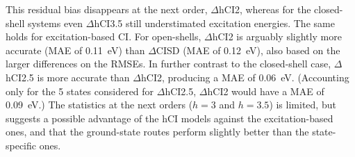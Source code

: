 \documentclass[aip,jcp,reprint,noshowkeys,superscriptaddress]{revtex4-1}
\begin{document}
This residual bias disappears at the next order, $\Delta$hCI2, whereas for the closed-shell systems even $\Delta$hCI3.5 still understimated excitation energies. 
The same holds for excitation-based CI.
For open-shells, $\Delta$hCI2 is arguably slightly more accurate (MAE of \SI{0.11}{\eV}) than $\Delta$CISD (MAE of \SI{0.12}{\eV}), also based on the larger differences on the RMSEs.
In further contrast to the closed-shell case,
$\Delta$hCI2.5 is more accurate than $\Delta$hCI2, producing a MAE of \SI{0.06}{\eV}.
(Accounting only for the 5 states considered for $\Delta$hCI2.5, $\Delta$hCI2 would have a MAE of \SI{0.09}{\eV}.)
The statistics at the next orders ($h=3$ and $h=3.5$) is limited, 
but suggests a possible advantage of the hCI models against the excitation-based ones,
and that the ground-state routes perform slightly better than the state-specific ones.
\end{document}

